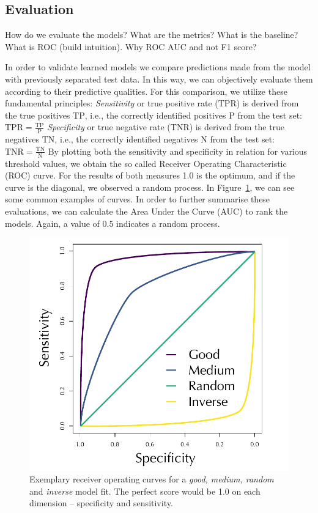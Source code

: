 \documentclass[conference]{IEEEtran}
\begin{document}
\subsection{Evaluation} %
How do we evaluate the models? What are the metrics? What is the baseline?
What is ROC (build intuition).
Why ROC AUC and not F1 score?

In order to validate learned models we compare predictions made from the model with previously separated test data. In this way, we can objectively evaluate them according to their predictive qualities. For this comparison, we utilize these fundamental principles:
\newline \textit{Sensitivity} or true positive rate ($\mathrm{TPR}$) is derived from the true positives $\mathrm{TP}$,  i.e., the correctly identified positives $\mathrm{P}$ from the test set: 
$
\mathrm{TPR}=\frac{\mathrm{TP}}{\mathrm{P}}
$
\newline \textit{Specificity} or true negative rate ($\mathrm{TNR}$) is derived from the true negatives $\mathrm{TN}$,  i.e., the correctly identified negatives $\mathrm{N}$ from the test set: 
$
\mathrm{TNR}=\frac{\mathrm{TN}}{\mathrm{N}}
$
\newline By plotting both the sensitivity and specificity in relation for various threshold values, we obtain the so called Receiver Operating Characteristic (ROC) curve. For the results of both measures 1.0 is the optimum, and if the curve is the diagonal, we observed a random process.  In Figure~\ref{fig:exroc}, we can see some common examples of curves. In order to further summarise these evaluations, we can calculate the Area Under the Curve (AUC) to rank the models. Again, a value of 0.5 indicates a random process.  \cite{Hastie2009}  \cite{Kauermann2021}  \cite{Russell2021}

\begin{figure}[h!]
\centering
\includegraphics[width=.65\linewidth]{pictures/ROC.pdf}
\caption[ROC explanation]{Exemplary receiver operating curves for  a \textit{good, medium, random} and \textit{inverse} model fit. The perfect score would be 1.0 on each dimension -- specificity and sensitivity.}
\label{fig:exroc}
\end{figure}
\end{document}
